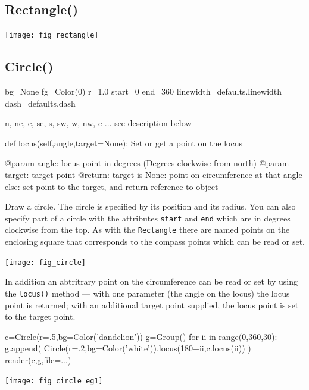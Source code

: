 \documentclass[a4paper]{book}
\begin{document}
\subsection{Rectangle()}
\label{sec:rectangle}

\begin{center}
  \texttt{[image: fig\_rectangle]}
\end{center}

\subsection{Circle()}
\label{sec:circle}
\begin{python}
    bg=None
    fg=Color(0)
    r=1.0
    start=0
    end=360
    linewidth=defaults.linewidth
    dash=defaults.dash
    
    n, ne, e, se, s, sw, w, nw, c  ... see description below

    def locus(self,angle,target=None):
        Set or get a point on the locus

        @param angle: locus point in degrees
                      (Degrees clockwise from north)
        @param target: target point
        @return: target is None: point on circumference at that angle
                 else: set point to the target, and return reference
                       to object

\end{python}
Draw a circle. The circle is specified by its position and its
radius.  You can also specify part of a circle with the attributes
\Verb|start| and \Verb|end| which are in degrees clockwise from the
top. As with the \Verb|Rectangle| there are named points on the
enclosing square that corresponds to the compass points which can be
read or set.
\begin{center}
  \texttt{[image: fig\_circle]}
\end{center}
In addition an abtritrary point on the circumference can be read or
set by using the \Verb|locus()| method --- with one parameter (the
angle on the locus) the locus point is returned; with an additional
target point supplied, the locus point is set to the target point.
\begin{example}
\begin{python}
c=Circle(r=.5,bg=Color('dandelion'))
g=Group()
for ii in range(0,360,30):
    g.append(
        Circle(r=.2,bg=Color('white')).locus(180+ii,c.locus(ii))
        )
render(c,g,file=...)
\end{python}
\begin{center}
  \texttt{[image: fig\_circle\_eg1]}
\end{center}
\end{example}
\end{document}
